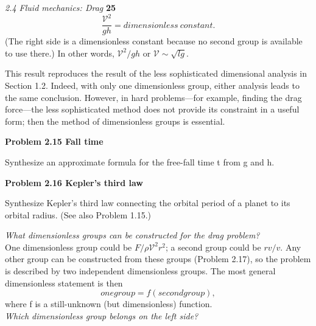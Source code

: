 \documentclass[a4paper, 12pt]{book}
\begin{document}
\noindent
\large\textit{2.4 Fluid mechanics: Drag} \hfill \textbf{25} \\
\begin{equation}\frac{\mathcal{V}^2}{gh}=dimensionless \ constant.\end{equation} 
(The right side is a dimensionless constant because no second group is
available to use there.) In other words, $\mathcal{V}^2/gh $ or $\mathcal{V}\sim \sqrt{lg}$.

This result reproduces the result of the less sophisticated dimensional
analysis in Section 1.2. Indeed, with only one dimensionless group, either
analysis leads to the same conclusion. However, in hard problems—for
example, finding the drag force—the less sophisticated method does not
provide its constraint in a useful form; then the method of dimensionless
groups is essential.\\

\colorbox{light-gray}{
\begin{minipage}{\textwidth}
\textbf {Problem 2.15 Fall time}

Synthesize an approximate formula for the free-fall time t from g and h.

\textbf {Problem 2.16 Kepler’s third law}

Synthesize Kepler’s third law connecting the orbital period of a planet to its
orbital radius. (See also Problem 1.15.)

\end{minipage}
} 

\textit{What dimensionless groups can be constructed for the drag problem?}\\

One dimensionless group could be $F/\rho\mathcal{V}^2r^2$; a second group could be $rv/v$.
Any other group can be constructed from these groups (Problem 2.17), so
the problem is described by two independent dimensionless groups. The
most general dimensionless statement is then
\begin{equation}one group = f(second group),\end{equation}
where f is a still-unknown (but dimensionless) function.\\

\textit{Which dimensionless group belongs on the left side?}\\
\end{document}
